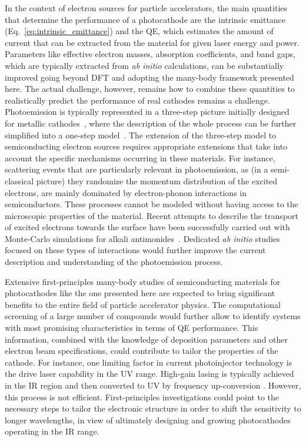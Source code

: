 \documentclass[aps,pra,superscriptaddress,twocolumn]{revtex4}
\begin{document}
In the context of electron sources for particle accelerators, the main quantities that determine the performance of a photocathode are the intrinsic emittance (Eq.~\ref{eq:intrinsic_emittance}) and the QE, which estimates the amount of current that can be extracted from the material for given laser energy and power.
Parameters like effective electron masses, absorption coefficients, and band gaps, which are typically extracted from \textit{ab initio} calculations, can be substantially improved going beyond DFT and adopting the many-body framework presented here. 
The actual challenge, however, remains how to combine these quantities to realistically predict the performance of real cathodes remains a challenge.
Photoemission is typically represented in a three-step picture initially designed for metallic cathodes~\cite{berg-spic64pr}, where the description of the whole process can be further simplified into a one-step model~\cite{kark+17prb}.
The extension of the three-step model to semiconducting electron sources requires appropriate extensions that take into account the specific mechanisms occurring in these materials.
For instance, scattering events that are particularly relevant in photoemission, as (in a semi-classical picture) they randomize the momentum distribution of the excited electrons, are mainly dominated by electron-phonon interactions in semiconductors.
These processes cannot be modeled without having access to the microscopic properties of the material.
Recent attempts to describe the transport of excited electrons towards the surface have been successfully carried out with Monte-Carlo simulations for alkali antimonides~\cite{xie+16prab,gupt+17jap}.
Dedicated \textit{ab initio} studies focused on these types of interactions would further improve the current description and understanding of the photoemission process.

Extensive first-principles many-body studies of semiconducting materials for photocathodes like the one presented here are expected to bring significant benefits to the entire field of particle accelerator physics. 
The computational screening of a large number of compounds would further allow to identify systems with most promising characteristics in terms of QE performance.
This information, combined with the knowledge of deposition parameters and other electron beam specifications, could contribute to tailor the properties of the cathode.
For instance, one limiting factor in current photoinjector technology is the drive laser capability in the UV range. 
High-gain lasing is typically achieved in the IR region and then converted to UV by frequency up-conversion \cite{panu-piot17apl}.
However, this process is not efficient. 
First-principles investigations could point to the necessary steps to tailor the electronic structure in order to shift the sensitivity to longer wavelengths, in view of ultimately designing and growing photocathodes operating in the IR range.
\end{document}
